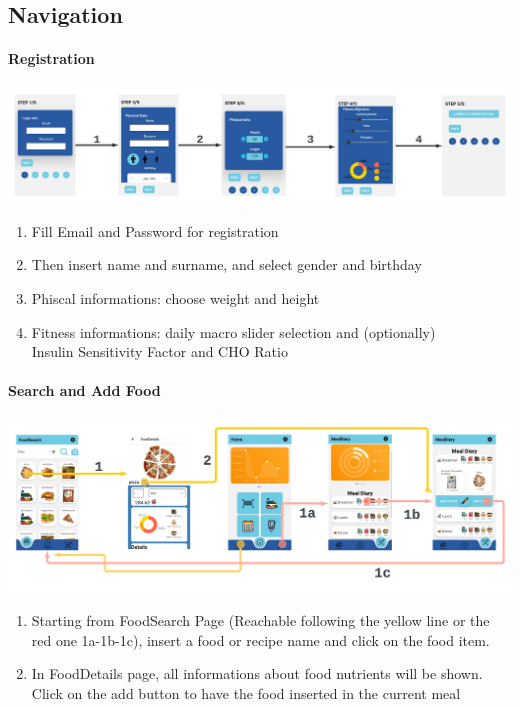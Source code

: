 \documentclass[12pt,hidelinks]{article}
\begin{document}
\subsection{Navigation}

\paragraph{Registration}

\begin{center}
	\includegraphics[scale=0.085]{Registration}
\end{center}

\begin{enumerate}
	\item Fill Email and Password for registration
	\item Then insert name and surname, and select gender and birthday
	\item Phiscal informations: choose weight and height
 	\item Fitness informations: daily macro slider selection and (optionally)\\ Insulin 
     Sensitivity Factor and CHO Ratio
  \end{enumerate}

\paragraph{Search and Add Food}

\begin{center}
	\includegraphics[scale=0.108]{Search Food}
\end{center}
\begin{enumerate}
	\item Starting from FoodSearch Page (Reachable following the yellow line or the red one 1a-1b-1c),
 insert a food or recipe name and click on the food item.
	\item In FoodDetails page, all informations about food nutrients will be shown. Click on the add button to
    have the food inserted in the current meal
  \end{enumerate}
\end{document}
